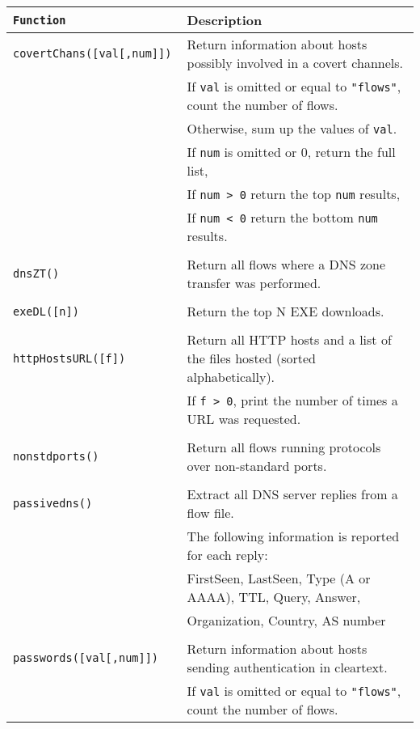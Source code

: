 \documentclass[documentation]{subfiles}
\begin{document}
\begin{longtable}{>{\tt}ll}
    \toprule
    {\bf Function} & {\bf Description}\\
    \midrule\endhead%
    covertChans([val[,num]]) & Return information about hosts possibly involved in a covert channels.\\
                             & If {\tt val} is omitted or equal to {\tt "flows"}, count the number of flows.\\
                             & Otherwise, sum up the values of {\tt val}.\\
                             & If {\tt num} is omitted or 0, return the full list,\\
                             & If {\tt num > 0} return the top {\tt num} results,\\
                             & If {\tt num < 0} return the bottom {\tt num} results.\\
    \\
    dnsZT()                  & Return all flows where a DNS zone transfer was performed.\\
    \\
    exeDL([n])               & Return the top N EXE downloads.\\
    \\
    httpHostsURL([f])        & Return all HTTP hosts and a list of the files hosted (sorted alphabetically).\\
                             & If {\tt f > 0}, print the number of times a URL was requested.\\
    \\
    nonstdports()            & Return all flows running protocols over non-standard ports.\\
    \\
    passivedns()             & Extract all DNS server replies from a flow file.\\
                             & The following information is reported for each reply:\\
                             & FirstSeen, LastSeen, Type (A or AAAA), TTL, Query, Answer,\\
                             & Organization, Country, AS number\\
    \\
    passwords([val[,num]])   & Return information about hosts sending authentication in cleartext.\\
                             & If {\tt val} is omitted or equal to {\tt "flows"}, count the number of flows.\\

\end{longtable}
\end{document}
